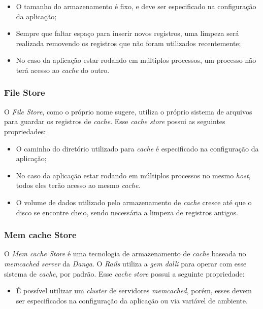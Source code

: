 \begin{itemize}
    \item O tamanho do armazenamento é fixo, e deve ser especificado na configuração da aplicação;
    \item Sempre que faltar espaço para inserir novos registros, uma limpeza será realizada removendo os registros que não foram utilizados recentemente;
    \item No caso da aplicação estar rodando em múltiplos processos, um processo não terá acesso ao \textit{cache} do outro.
\end{itemize}

\subsubsection{File Store}

O \textit{File Store}, como o próprio nome sugere, utiliza o próprio sistema de arquivos para guardar os registros de \textit{cache}. Esse \textit{cache store} possui as seguintes propriedades:

\begin{itemize}
    \item O caminho do diretório utilizado para \textit{cache} é especificado na configuração da aplicação;
    \item No caso da aplicação estar rodando em múltiplos processos no mesmo \textit{host}, todos eles terão acesso ao mesmo \textit{cache}.
    \item O volume de dados utilizado pelo armazenamento de \textit{cache} cresce até que o disco se encontre cheio, sendo necessária a limpeza de registros antigos.
\end{itemize}

\subsubsection{Mem cache Store}

O \textit{Mem cache Store} é uma tecnologia de armazenamento de \textit{cache} baseada no \textit{memcached server} da \textit{Danga}. O \textit{Rails} utiliza a \textit{gem dalli} para operar com esse sistema de \textit{cache}, por padrão. Esse \textit{cache} \textit{store} possui a seguinte propriedade:

\begin{itemize}
    \item É possível utilizar um \textit{cluster} de servidores \textit{memcached}, porém, esses devem ser especificados na configuração da aplicação ou via variável de ambiente.
\end{itemize}

